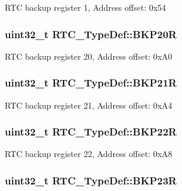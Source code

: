 R\-T\-C backup register 1, Address offset\-: 0x54 \hypertarget{struct_r_t_c___type_def_a3e391ffa70a17dc5f95a841b5ec7554c}{
\subsubsection[{B\-K\-P20\-R}]{ uint32\-\_\-t R\-T\-C\-\_\-\-Type\-Def\-::\-B\-K\-P20\-R}}\label{struct_r_t_c___type_def_a3e391ffa70a17dc5f95a841b5ec7554c}
R\-T\-C backup register 20, Address offset\-: 0x\-A0 \hypertarget{struct_r_t_c___type_def_a170847c24f166be0939a6eaeed7eeeee}{
\subsubsection[{B\-K\-P21\-R}]{ uint32\-\_\-t R\-T\-C\-\_\-\-Type\-Def\-::\-B\-K\-P21\-R}}\label{struct_r_t_c___type_def_a170847c24f166be0939a6eaeed7eeeee}
R\-T\-C backup register 21, Address offset\-: 0x\-A4 \hypertarget{struct_r_t_c___type_def_a679ec46535cae5149dc4d84e7c5d985c}{
\subsubsection[{B\-K\-P22\-R}]{ uint32\-\_\-t R\-T\-C\-\_\-\-Type\-Def\-::\-B\-K\-P22\-R}}\label{struct_r_t_c___type_def_a679ec46535cae5149dc4d84e7c5d985c}
R\-T\-C backup register 22, Address offset\-: 0x\-A8 \hypertarget{struct_r_t_c___type_def_a7836b793c4ecc58a27733329f26550a7}{
\subsubsection[{B\-K\-P23\-R}]{ uint32\-\_\-t R\-T\-C\-\_\-\-Type\-Def\-::\-B\-K\-P23\-R}}\label{struct_r_t_c___type_def_a7836b793c4ecc58a27733329f26550a7}
